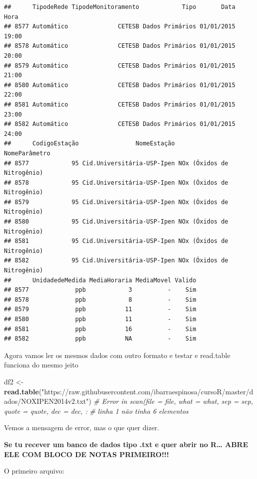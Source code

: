 \documentclass[]{book}
\newenvironment{Shaded}{\begin{snugshade}}{\end{snugshade}}
\newcommand{\KeywordTok}[1]{\textcolor[rgb]{0.13,0.29,0.53}{\textbf{#1}}}
\newcommand{\StringTok}[1]{\textcolor[rgb]{0.31,0.60,0.02}{#1}}
\newcommand{\CommentTok}[1]{\textcolor[rgb]{0.56,0.35,0.01}{\textit{#1}}}
\newcommand{\NormalTok}[1]{#1}
\theoremstyle{definition}
\theoremstyle{definition}
\theoremstyle{definition}
\theoremstyle{remark}
\begin{document}
\begin{verbatim}
##      TipodeRede TipodeMonitoramento            Tipo       Data  Hora
## 8577 Automático              CETESB Dados Primários 01/01/2015 19:00
## 8578 Automático              CETESB Dados Primários 01/01/2015 20:00
## 8579 Automático              CETESB Dados Primários 01/01/2015 21:00
## 8580 Automático              CETESB Dados Primários 01/01/2015 22:00
## 8581 Automático              CETESB Dados Primários 01/01/2015 23:00
## 8582 Automático              CETESB Dados Primários 01/01/2015 24:00
##      CodigoEstação                NomeEstação              NomeParâmetro
## 8577            95 Cid.Universitária-USP-Ipen NOx (Óxidos de Nitrogênio)
## 8578            95 Cid.Universitária-USP-Ipen NOx (Óxidos de Nitrogênio)
## 8579            95 Cid.Universitária-USP-Ipen NOx (Óxidos de Nitrogênio)
## 8580            95 Cid.Universitária-USP-Ipen NOx (Óxidos de Nitrogênio)
## 8581            95 Cid.Universitária-USP-Ipen NOx (Óxidos de Nitrogênio)
## 8582            95 Cid.Universitária-USP-Ipen NOx (Óxidos de Nitrogênio)
##      UnidadedeMedida MediaHoraria MediaMovel Valido
## 8577             ppb            3          -    Sim
## 8578             ppb            8          -    Sim
## 8579             ppb           11          -    Sim
## 8580             ppb           11          -    Sim
## 8581             ppb           16          -    Sim
## 8582             ppb           NA          -    Sim
\end{verbatim}

Agora vamos ler os mesmos dados com outro formato e testar e read.table
funciona do mesmo jeito

\begin{Shaded}
\begin{Highlighting}[]
\NormalTok{df2 <-}\StringTok{ }\KeywordTok{read.table}\NormalTok{(}\StringTok{"https://raw.githubusercontent.com/ibarraespinosa/cursoR/master/dados/NOXIPEN2014v2.txt"}\NormalTok{)}
\CommentTok{# Error in scan(file = file, what = what, sep = sep, quote = quote, dec = dec, : }
\CommentTok{# linha 1 não tinha 6 elementos}
\end{Highlighting}
\end{Shaded}

Vemos a mensagem de error, mas o que quer dizer.

\textbf{Se tu recever um banco de dados tipo .txt e quer abrir no
R\ldots{} ABRE ELE COM BLOCO DE NOTAS PRIMEIRO!!!}

O primeiro arquivo:
\end{document}

